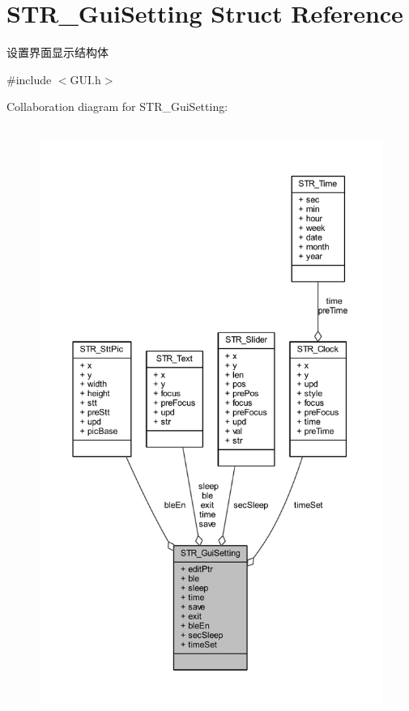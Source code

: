 \hypertarget{struct_s_t_r___gui_setting}{\section{\-S\-T\-R\-\_\-\-Gui\-Setting \-Struct \-Reference}
\label{struct_s_t_r___gui_setting}
}


设置界面显示结构体  




{\ttfamily \#include $<$\-G\-U\-I.\-h$>$}



\-Collaboration diagram for \-S\-T\-R\-\_\-\-Gui\-Setting\-:\nopagebreak
\begin{figure}[H]
\begin{center}
\leavevmode
\includegraphics[height=550pt]{struct_s_t_r___gui_setting__coll__graph}
\end{center}
\end{figure}
